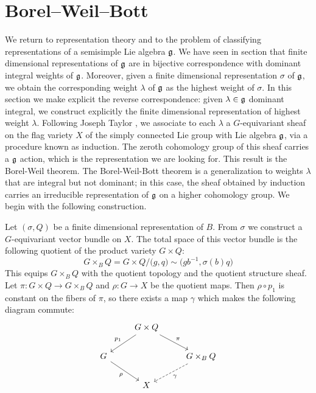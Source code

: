 \section{Borel--Weil--Bott}
We return to representation theory and to the problem of classifying representations of a semisimple Lie algebra
$\mathfrak g$. We have seen in section  that finite dimensional representations of $\mathfrak g$ are in
bijective correspondence with dominant integral weights of $\mathfrak g$. Moreover, given a finite dimensional representation
$\sigma$ of $\mathfrak g$, we obtain the corresponding weight $\lambda$ of $\mathfrak g$ as the highest weight of $\sigma$.
In this section we make explicit the reverse correspondence: given $\lambda \in \mathfrak g$ dominant integral, we construct
explicitly the finite dimensional representation of highest weight $\lambda$. Following Joseph Taylor , we associate to each $\lambda$ a $G$-equivariant sheaf on the flag variety $X$ of the simply connected Lie group 
with Lie algebra $\mathfrak g$, via a procedure known as induction. The zeroth cohomology
group of this sheaf carries a $\mathfrak g$ action, which is the representation we are looking for. This 
result is the Borel-Weil theorem. The Borel-Weil-Bott theorem is a generalization to weights $\lambda$ that are
integral but not dominant; in this case, the sheaf obtained by induction carries an irreducible representation of $\mathfrak g$
on a higher cohomology group. We begin with the following construction.

Let $(\sigma, Q)$ be a finite dimensional representation of $B$. From $\sigma$ we construct a $G$-equivariant
vector bundle on $X$.  The total space of
this vector bundle is the following quotient of the product variety $G\times Q$:
\begin{equation}
G\times_B Q = G\times Q / \big(g,q\big) \sim \big(gb^{-1} , \sigma(b) q\big)
\end{equation}
This equips $G\times_B Q$ with the quotient topology and the quotient structure sheaf. Let $\pi: G\times Q \to 
G\times_B Q$ and $\rho : G \to X$ be the quotient maps. Then $\rho \circ p_1$ is constant on the fibers of $\pi$,
so there exists a map $\gamma$ which makes the following diagram commute:
\[
\begin{tikzcd}
\; & G \times Q\arrow[swap]{dl}{p_1}\arrow{dr}{\pi} & \\
G\arrow[swap]{dr}{\rho} & & G\times_B Q\arrow[dashed]{dl}{\gamma} \\
 & X & 
\end{tikzcd}
\]

